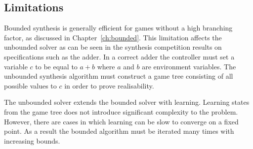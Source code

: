 
\subsection{Limitations}

Bounded synthesis is generally efficient for games without a high branching factor, as discussed in Chapter~\ref{ch:bounded}. This limitation affects the unbounded solver as can be seen in the synthesis competition results on specifications such as the adder. In a correct adder the controller must set a variable $c$ to be equal to $a + b$ where $a$ and $b$ are environment variables. The unbounded synthesis algorithm must construct a game tree consisting of all possible values to $c$ in order to prove realisability.

The unbounded solver extends the bounded solver with learning. Learning states from the game tree does not introduce significant complexity to the problem. However, there are cases in which learning can be slow to converge on a fixed point. As a result the bounded algorithm must be iterated many times with increasing bounds.

